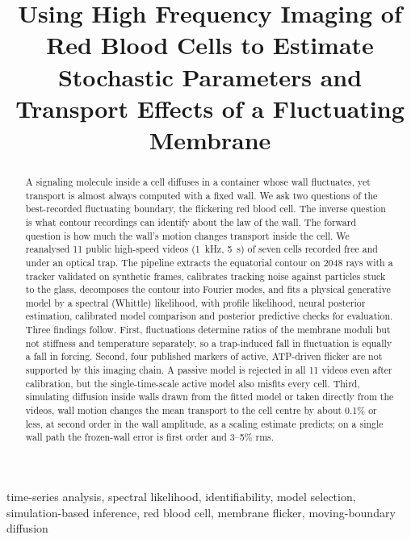 \documentclass[conference]{IEEEtran}
\begin{document}
\title{Using High Frequency Imaging of Red Blood Cells to Estimate Stochastic Parameters and Transport Effects of a Fluctuating Membrane}

\author{
}

\maketitle

\begin{abstract}
A signaling molecule inside a cell diffuses in a container whose wall fluctuates, yet transport is
almost always computed with a fixed wall. We ask two questions of the best-recorded fluctuating
boundary, the flickering red blood cell. The inverse question is what contour recordings can
identify about the law of the wall. The forward question is how much the wall's motion changes
transport inside the cell. We reanalysed 11 public high-speed videos (1~kHz, 5~s) of seven cells
recorded free and under an optical trap. The pipeline extracts the equatorial contour on 2048 rays
with a tracker validated on synthetic frames, calibrates tracking noise against particles stuck to
the glass, decomposes the contour into Fourier modes, and fits a physical generative model by a
spectral (Whittle) likelihood, with profile likelihood, neural posterior estimation, calibrated
model comparison and posterior predictive checks for evaluation. Three findings follow. First,
fluctuations determine ratios of the membrane moduli but not stiffness and temperature separately,
so a trap-induced fall in fluctuation is equally a fall in forcing. Second, four published markers
of active, ATP-driven flicker are not supported by this imaging chain. A passive model is rejected
in all 11 videos even after calibration, but the single-time-scale active model also misfits every
cell. Third, simulating diffusion inside walls drawn from the fitted model or taken directly from
the videos, wall motion changes the mean transport to the cell centre by about 0.1\% or less, at
second order in the wall amplitude, as a scaling estimate predicts; on a single wall path the
frozen-wall error is first order and 3--5\% rms.
\end{abstract}

\begin{IEEEkeywords}
time-series analysis, spectral likelihood, identifiability, model selection, simulation-based
inference, red blood cell, membrane flicker, moving-boundary diffusion
\end{IEEEkeywords}
\end{document}
